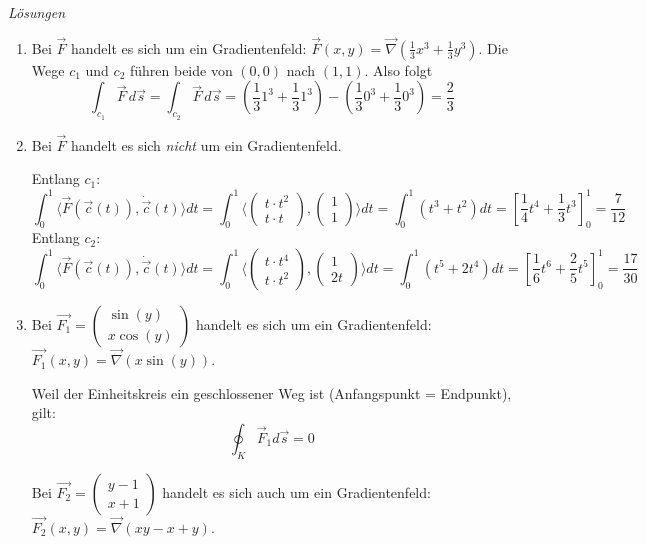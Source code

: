 \clearpage
\emph{Lösungen}
\begin{enumerate}
    \item Bei \(\vec{F}\) handelt es sich um ein Gradientenfeld: \(\vec{F}(x,y) = \vec{\nabla} \left(\frac{1}{3}x^3+\frac{1}{3}y^3\right)\). Die Wege \(c_1\) und \(c_2\) führen beide von \((0,0)\) nach \((1,1)\). Also folgt
          \[\int_{c_1} \vec{F} \, d\vec{s} = \int_{c_2} \vec{F} \, d\vec{s} = \left(\frac{1}{3}1^3+\frac{1}{3}1^3\right) - \left(\frac{1}{3}0^3+\frac{1}{3}0^3\right) = \frac{2}{3}\]
    \item Bei \(\vec{F}\) handelt es sich \emph{nicht} um ein Gradientenfeld.

          Entlang \( c_1 \):
          \[
              \int_0^1 \langle \vec{F}(\vec{c}(t)), \dot{\vec{c}}(t) \rangle dt = \int_0^1 \langle \begin{pmatrix} t \cdot t^2 \\ t \cdot t \end{pmatrix} , \begin{pmatrix} 1 \\ 1 \end{pmatrix}\rangle dt = \int_0^1 (t^3 + t^2) dt = \left[\frac{1}{4}t^4 + \frac{1}{3}t^3 \right]_0^1 = \frac{7}{12}
          \]
          Entlang \( c_2 \):
          \[
              \int_0^1 \langle \vec{F}(\vec{c}(t)), \dot{\vec{c}}(t) \rangle dt = \int_0^1 \langle \begin{pmatrix} t \cdot t^4 \\ t \cdot t^2 \end{pmatrix} , \begin{pmatrix} 1 \\ 2t \end{pmatrix}\rangle dt = \int_0^1 (t^5 + 2t^4) dt = \left[\frac{1}{6}t^6 + \frac{2}{5}t^5 \right]_0^1 = \frac{17}{30}
          \]
    \item Bei \(\vec{F_1}=\begin{pmatrix}
              \sin(y) \\
              x \cos(y)
          \end{pmatrix} \) handelt es sich um ein Gradientenfeld: \(\vec{F_1}(x,y) = \vec{\nabla} \left( x\sin(y) \right)\).

          Weil der Einheitskreis ein geschlossener Weg ist (Anfangspunkt = Endpunkt), gilt: \[\oint_K \vec{F}_1 d\vec{s} = 0\]

          Bei \(\vec{F_2}=\begin{pmatrix}
              y-1 \\
              x+1
          \end{pmatrix} \) handelt es sich auch um ein Gradientenfeld: \(\vec{F_2}(x,y) = \vec{\nabla} \left( xy-x+y \right)\).


\end{enumerate}
